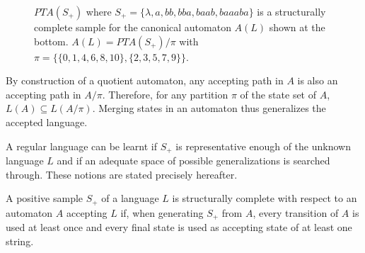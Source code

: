 \begin{figure}
\begin{center}
\caption{$PTA(S_+)$ where $S_+ = \{\lambda,a,bb,bba,baab,baaaba\}$ is a structurally complete sample 
for the canonical automaton $A(L)$ shown at the bottom. $A(L) = PTA(S_+)/\pi$ with $\pi=\{\{0,1,4,6,8,10\},\{2,3,5,7,9\}\}$.\label{fig:pta:quotient}}
\end{center}
\end{figure}

By construction of a quotient automaton, any accepting path in $A$ is also an accepting path in $A/\pi$. Therefore, for any partition $\pi$ of the state set of $A$, $L(A) \subseteq L(A/\pi) $. Merging states in an automaton thus generalizes the accepted language.
 
A regular language can be learnt if $S_+$ is representative enough of the unknown language $L$ and if an adequate space of possible generalizations is searched through. These notions are stated precisely hereafter.

\begin{definition} A positive sample $S_+$ of a language $L$ is structurally complete with respect to an automaton $A$ accepting $L$ if, when generating $S_+$ from $A$, every transition of $A$ is used at least once and every final state is used as accepting state of at least one string.
\label{structural:completeness}
\end{definition}

